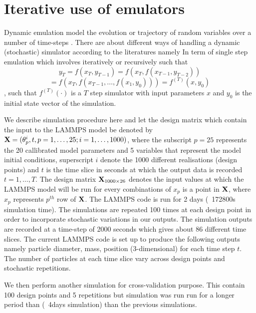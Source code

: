 \documentclass[12pt,titlepage]{report}
\newcommand{\bX}{{\bf X}}
\theoremstyle{definition}
\theoremstyle{remark}
\begin{document}
\section{Iterative use of emulators}
Dynamic emulation model the evolution or trajectory of random variables over a number of
time-steps \cite{pd12}. There are about different ways of handling a dynamic (stochastic) simulator according to the literatures namely 
In term of single step emulation which involves iteratively or recursively such that
\begin{equation}
y_T = f(x_T , y_{T-1}) = f (x_T , f(x_{T-1}, y_{T-2})	)
\end{equation}
$$= f (x_T , f(x_{T-1},\ldots,f(x_1, y_0))	)= f^{(T)} (x, y_0)$$, such that $f^{(T)}(·)$ is a $T$ step simulator with input
parameters $x$ and $y_0$ is the initial state vector of the simulation.


We describe simulation procedure here and let the design matrix which contain the input to the LAMMPS model be denoted by $\bX=(\theta^i_p, t, p=1,\ldots,25; i=1,\ldots,1000)$, where the subscript $p=25$ represents the 20 callibrated model parameters and 5 variables that represent the model initial conditions, superscript $i$ denote the 1000 different realisations (design points) and $t$ is the time slice in seconds at which the output data is recorded $t=1,\ldots,T$. The design matrix $\bX_{1000 \times 26}$ denotes the input values at which the LAMMPS model will be run for every combinations of $x_p$ is a point in $\bX$, where $x_p$ represents $p^{th}$ row of $\bX$.  The LAMMPS code is run for 2 days (~172800s simulation time). The simulations are repeated 100 times at each design point in order to incorporate stochastic variations in our outputs. The simulation outputs are recorded at a time-step of 2000 seconds which gives about 86 different time slices. The current LAMMPS code is set up to produce the following outputs namely particle diameter, mass, position (3-dimensional) for each time step $t$. The number of particles at each time slice vary across design points and stochastic repetitions.

We then perform another simulation for cross-validation purpose. This contain 100 design points and 5 repetitions but simulation was run run for a longer period than (~4days simulation) than the previous simulations.
\end{document}
